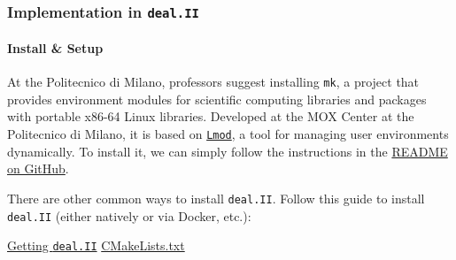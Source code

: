 \subsubsection{Implementation in \texttt{deal.II}}

\paragraph{Install \& Setup}

At the Politecnico di Milano, professors suggest installing \texttt{mk}, a project that provides environment modules for scientific computing libraries and packages with portable x86-64 Linux libraries. Developed at the MOX Center at the Politecnico di Milano, it is based on \href{https://lmod.readthedocs.io/en/latest/index.html}{\texttt{Lmod}}, a tool for managing user environments dynamically. To install it, we can simply follow the instructions in the \href{https://github.com/pcafrica/mk}{README on GitHub}.

\highspace
There are other common ways to install \texttt{deal.II}. Follow this guide to install \texttt{deal.II} (either natively or via Docker, etc.):
\begin{center}
    \href{https://github.com/dealii/dealii/wiki/Getting-deal.II}{Getting \texttt{deal.II}} \hspace{.5em}
    \hspace{2em}
    \href{https://gist.github.com/AndreVale69/f04f312da68d16c253f46493ae7eaf24#file-cmakelists-txt}{ CMakeLists.txt}
    \hspace{.5em}
\end{center}

